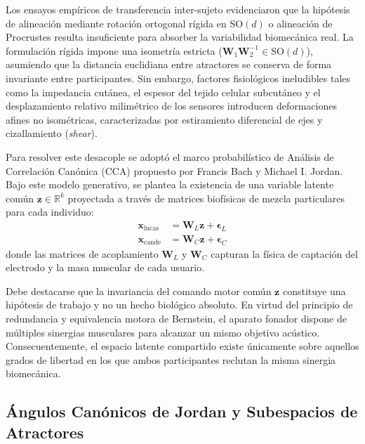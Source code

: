 \documentclass[11pt,a4paper,openany]{book}
\theoremstyle{definition}
\begin{document}
Los ensayos empíricos de transferencia inter-sujeto evidenciaron que la hipótesis de alineación mediante rotación ortogonal rígida en $\text{SO}(d)$ o alineación de Procrustes resulta insuficiente para absorber la variabilidad biomecánica real. La formulación rígida impone una isometría estricta ($\mathbf{W}_1 \mathbf{W}_2^{-1} \in \text{SO}(d)$), asumiendo que la distancia euclidiana entre atractores se conserva de forma invariante entre participantes. Sin embargo, factores fisiológicos ineludibles tales como la impedancia cutánea, el espesor del tejido celular subcutáneo y el desplazamiento relativo milimétrico de los sensores introducen deformaciones afines no isométricas, caracterizadas por estiramiento diferencial de ejes y cizallamiento (\textit{shear}).

Para resolver este desacople se adoptó el marco probabilístico de Análisis de Correlación Canónica (CCA) propuesto por Francis Bach y Michael I. Jordan. Bajo este modelo generativo, se plantea la existencia de una variable latente común $\mathbf{z} \in \mathbb{R}^k$ proyectada a través de matrices biofísicas de mezcla particulares para cada individuo:
\begin{align}
    \mathbf{x}_{\text{lucas}} &= \mathbf{W}_L \mathbf{z} + \boldsymbol{\epsilon}_L \\
    \mathbf{x}_{\text{cande}} &= \mathbf{W}_C \mathbf{z} + \boldsymbol{\epsilon}_C
\end{align}
donde las matrices de acoplamiento $\mathbf{W}_L$ y $\mathbf{W}_C$ capturan la física de captación del electrodo y la masa muscular de cada usuario. 

Debe destacarse que la invariancia del comando motor común $\mathbf{z}$ constituye una hipótesis de trabajo y no un hecho biológico absoluto. En virtud del principio de redundancia y equivalencia motora de Bernstein, el aparato fonador dispone de múltiples sinergias musculares para alcanzar un mismo objetivo acústico. Consecuentemente, el espacio latente compartido existe únicamente sobre aquellos grados de libertad en los que ambos participantes reclutan la misma sinergia biomecánica.

\subsection{Ángulos Canónicos de Jordan y Subespacios de Atractores}
\label{subsec:angulos_jordan}
\end{document}
